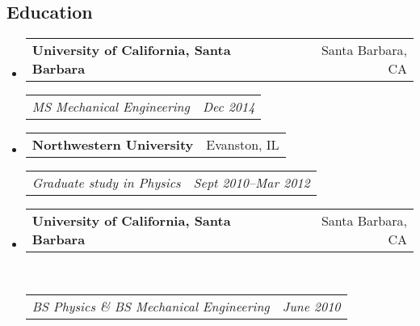\documentclass[10pt,letterpaper]{article}
\makeatletter
\newcommand{\headerrow}[2]
{\begin{tabular*}{\linewidth}{l@{\extracolsep{\fill}}r}
	#1 &
	#2 \\
\end{tabular*}}
\makeatother
\begin{document}
\subsection*{Education}
\begin{itemize}
	\parskip=-0.1em
	\item 
	\headerrow
		{\textbf{University of California, Santa Barbara}}
		{Santa Barbara, CA}
	\headerrow
		{\emph{MS  Mechanical Engineering}}
		{\emph{Dec 2014}}
	\item 
	\headerrow
		{\textbf{Northwestern University}}
		{Evanston, IL}
	\headerrow
		{\emph{Graduate study in Physics}}
		{\emph{Sept 2010--Mar 2012}}
	\item 
	\headerrow
		{\textbf{University of California, Santa Barbara}}
		{Santa Barbara, CA}	\\
	\headerrow
		{\emph{BS Physics \&  BS Mechanical Engineering}}
		{\emph{June 2010}}
\end{itemize}
\end{document}
